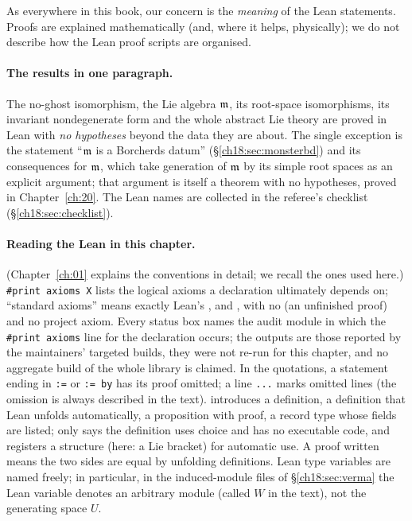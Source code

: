 As everywhere in this book, our concern is the \emph{meaning} of the Lean statements.  Proofs are
explained mathematically (and, where it helps, physically); we do not describe how the Lean proof
scripts are organised.

\paragraph{The results in one paragraph.}  The no-ghost isomorphism, the Lie algebra $\mathfrak{m}$, its root-space
isomorphisms, its invariant nondegenerate form and the whole abstract Lie theory are proved in Lean with \emph{no
hypotheses} beyond the data they are about.  The single exception is the statement ``$\mathfrak{m}$ is a Borcherds datum''
(\S\ref{ch18:sec:monsterbd}) and its consequences for $\mathfrak{m}$, which take generation of $\mathfrak{m}$ by its simple root spaces
as an explicit argument; that argument is itself a theorem with no hypotheses, proved in Chapter~\ref{ch:20}.  The Lean
names are collected in the referee's checklist (\S\ref{ch18:sec:checklist}).

\paragraph{Reading the Lean in this chapter.}  (Chapter~\ref{ch:01} explains the conventions in detail; we recall the
ones used here.)  \texttt{\#print axioms X} lists the logical axioms a declaration  ultimately depends on;
``standard axioms'' means exactly Lean's ,  and , with no
 (an unfinished proof) and no project axiom.  Every status box names the audit module in which the
\texttt{\#print axioms} line for the declaration occurs; the outputs are those reported by the maintainers' targeted
builds, they were not re-run for this chapter, and no aggregate build of the whole library is claimed.  In the
quotations, a statement ending in \texttt{:=} or \texttt{:= by} has its proof omitted; a line \texttt{...} marks
omitted lines (the omission is always described in the text).   introduces a definition,  a
definition that Lean unfolds automatically,  a proposition with proof,  a record type
whose fields are listed;  only says the definition uses choice and has no executable code, and
 registers a structure (here: a Lie bracket) for automatic use.  A proof written  means the
two sides are equal by unfolding definitions.  Lean type variables are named freely; in particular, in the induced-module
files of \S\ref{ch18:sec:verma} the Lean variable  denotes an arbitrary module (called $W$ in the text), not the
generating space $U$.

